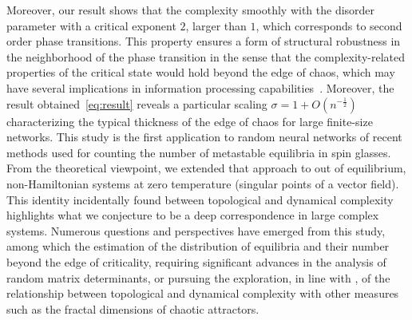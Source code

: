 Moreover, our result shows that the complexity smoothly with the disorder parameter with a critical exponent $2$, larger than $1$, which corresponds to second order phase transitions. This property ensures a form of structural robustness in the neighborhood of the phase transition in the sense that the complexity-related properties of the critical state would hold beyond the edge of chaos, which may have several implications in information processing capabilities~\cite{abbott-toyoizumi:11}. Moreover, the result obtained~\eqref{eq:result} reveals a particular scaling $\sigma=1+O(n^{-\frac 1 2 })$ characterizing the typical thickness of the edge of chaos for large finite-size networks. This study is the first application to random neural networks of recent methods used for counting the number of metastable equilibria in spin glasses. From the theoretical viewpoint, we extended that approach to out of equilibrium, non-Hamiltonian systems at zero temperature (singular points of a vector field). This identity incidentally found between topological and dynamical complexity highlights what we conjecture to be a deep correspondence in large complex systems. Numerous questions and perspectives have emerged from this study, among which the estimation of the distribution of equilibria and their number beyond the edge of criticality, requiring significant advances in the analysis of random matrix determinants, or pursuing the exploration, in line with \cite{ledrappier1985metric,frederickson1983liapunov,chatterjee:08}, of the relationship between topological and dynamical complexity with other measures such as the fractal dimensions of chaotic attractors.
\medskip

